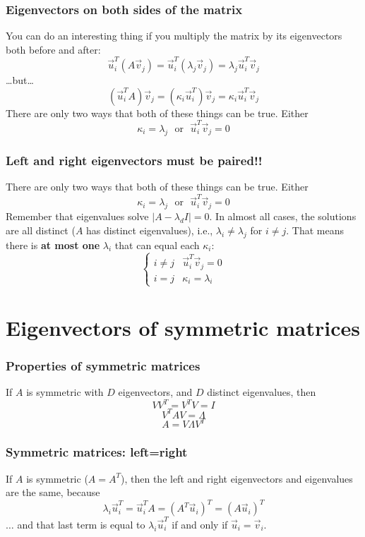 \documentclass{beamer}
\begin{document}
\begin{frame}
  \frametitle{Eigenvectors on both sides of the matrix}
  You can do an interesting thing if you multiply the matrix by its eigenvectors both before and after:
  \[
  \vec{u}_i^T(A\vec{v}_j)=\vec{u}_i^T(\lambda_j\vec{v}_j)=\lambda_j\vec{u}_i^T\vec{v}_j
  \]
  \ldots but\ldots
  \[
  (\vec{u}_i^TA)\vec{v}_j=(\kappa_i\vec{u}_i^T)\vec{v}_j=\kappa_i\vec{u}_i^T\vec{v}_j
  \]
  There are only two ways that both of these things can be true. Either
  \[
  \kappa_i=\lambda_j~~~\mbox{or}~~~\vec{u}_i^T\vec{v}_j=0
  \]
\end{frame}

\begin{frame}
  \frametitle{Left and right eigenvectors must be paired!!}
  There are only two ways that both of these things can be true. Either
  \[
  \kappa_i=\lambda_j~~~\mbox{or}~~~\vec{u}_i^T\vec{v}_j=0
  \]
  Remember that eigenvalues solve $|A-\lambda_d I|=0$.  In almost all
  cases, the solutions are all distinct ($A$ has distinct
  eigenvalues), i.e., $\lambda_i\ne\lambda_j$ for $i\ne j$.  That
  means there is {\bf at most one} $\lambda_i$ that can equal each
  $\kappa_i$:
  \[
  \begin{cases}
    i\ne j & \vec{u}_i^T\vec{v}_j = 0\\
    i=j & \kappa_i = \lambda_i
  \end{cases}
  \]
\end{frame}


\section[Symmetric]{Eigenvectors of symmetric matrices}
\setcounter{subsection}{1}

\begin{frame}
  \frametitle{Properties of symmetric matrices}
  If $A$ is symmetric with $D$ eigenvectors, and $D$ distinct eigenvalues, then
  \[
  VV^T=V^TV=I
  \]
  \[
  V^TAV = \Lambda
  \]
  \[
  A=V\Lambda V^T
  \]
\end{frame}

\begin{frame}
  \frametitle{Symmetric matrices: left=right}

  If $A$ is symmetric ($A=A^T$), then the left and right eigenvectors
  and eigenvalues are the same, because
  \[
  \lambda_i\vec{u}_i^T=\vec{u}_i^TA=(A^T\vec{u}_i)^T=(A\vec{u}_i)^T
  \]
  $\ldots$ and that last term is equal to $\lambda_i\vec{u}_i^T$ if and
  only if $\vec{u}_i=\vec{v}_i$.
\end{frame}
\end{document}
